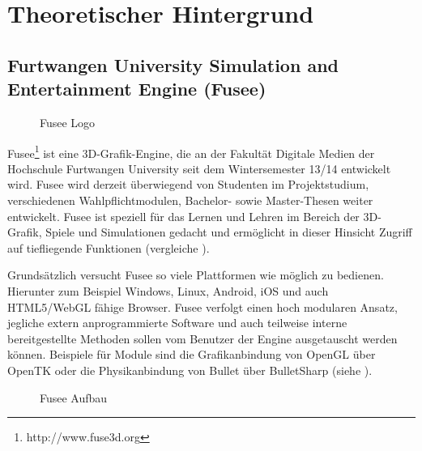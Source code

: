 \section{Theoretischer Hintergrund}

\subsection{Furtwangen University Simulation and Entertainment Engine (Fusee)}

\begin{figure}[htbp]
  \centering
  \caption{Fusee Logo}
  \label{fig:FuseeLogo}
\end{figure}

Fusee\footnote{http://www.fuse3d.org} ist eine 3D-Grafik-Engine, die an der Fakultät Digitale Medien der Hochschule Furtwangen University seit dem Wintersemester 13/14 entwickelt wird. Fusee wird derzeit überwiegend von Studenten im Projektstudium, verschiedenen Wahlpflichtmodulen, Bachelor- sowie Master-Thesen weiter entwickelt. Fusee ist speziell für das Lernen und Lehren im Bereich der 3D-Grafik, Spiele und Simulationen gedacht und ermöglicht in dieser Hinsicht Zugriff auf tiefliegende Funktionen (vergleiche \cite{Muller.2014}).

Grundsätzlich versucht Fusee so viele Plattformen wie möglich zu bedienen. Hierunter zum Beispiel Windows, Linux, Android, iOS und auch HTML5/WebGL fähige Browser. Fusee verfolgt einen hoch modularen Ansatz, jegliche extern anprogrammierte Software und auch teilweise interne bereitgestellte Methoden sollen vom Benutzer der Engine ausgetauscht werden können. Beispiele für Module sind die Grafikanbindung von OpenGL über OpenTK oder die Physikanbindung von Bullet über BulletSharp (siehe \cite{Schey.2014}).

\begin{figure}[htbp]
  \centering
  \caption{Fusee Aufbau}
  \label{fig:FuseeAufbau}
\end{figure}

